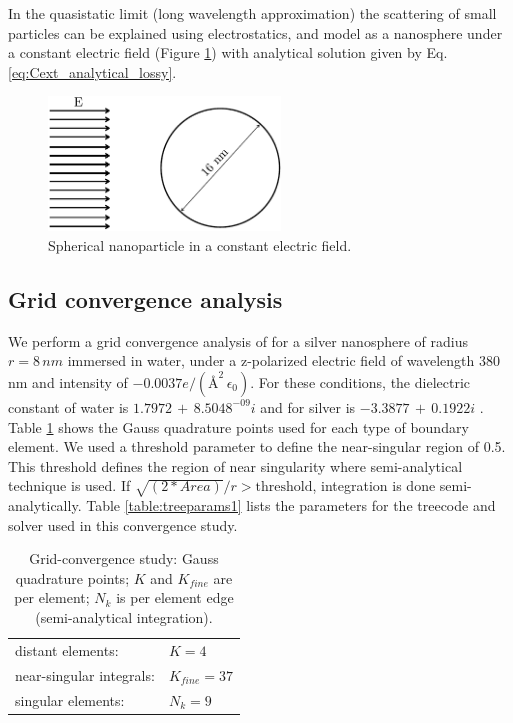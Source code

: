 In the quasistatic limit (long wavelength approximation) the scattering 
of small particles can be explained using electrostatics, and model as
a nanosphere under a constant electric field (Figure \ref{fig:sph_field}) 
with analytical solution given by Eq. \eqref{eq:Cext_analytical_lossy}.

\begin{figure}%
    \centering
    \includegraphics[width=0.55\textwidth]{sphere_field_8nm.pdf} 
    \caption{Spherical nanoparticle in a constant electric field.}
    \label{fig:sph_field}
\end{figure}

\subsection{Grid convergence analysis}\label{sub_sec:grid_conv}

We perform a grid convergence analysis of \pygbe for a silver nanosphere 
of radius $r=8\,nm$ immersed in water, under a z-polarized electric field
of wavelength 380 nm and intensity of $-0.0037 e/(\text{\AA}^2 \, \epsilon_0)$.
For these conditions, the dielectric constant of water is
$1.7972 \, + \, 8.5048^{-09}i$ \cite{HaleQuerry1972} and for silver is
$-3.3877 \, + \, 0.1922i$ \cite{JohnsonChristy1972}. 
Table  \ref{table:quadparams1} shows the Gauss quadrature points used for each 
type of boundary element. We used a threshold parameter to define the near-singular
region of 0.5. This threshold defines the region of near singularity where 
semi-analytical technique is used. If $\sqrt{(2*Area)}/r > \text{threshold}$,
integration is done semi-analytically.
Table \ref{table:treeparams1} lists the parameters for the treecode and solver 
used in this convergence study.

\begin{table}%
    \centering
    \caption{\label{table:quadparams1} Grid-convergence study: Gauss quadrature points; 
    $K$ and $K_{fine}$ are per element; $N_k $ is per element edge (semi-analytical integration). } 
    \begin{tabular}{l l}
    \hline%
     distant elements: & $K=4$ \\
     near-singular integrals:   & $ K_{fine}=37$ \\
     singular elements:  & $N_k =9$ \\
    \hline%
    \end{tabular}
\end{table}


